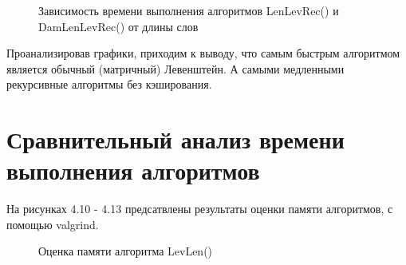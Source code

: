 \begin{figure}
	\caption{Зависимость времени выполнения алгоритмов LenLevRec() и DamLenLevRec() от длины слов}
\end{figure}

\newpage
Проанализировав графики, приходим к выводу, что самым быстрым алгоритмом является обычный (матричный) Левенштейн. А самыми медленными рекурсивные алгоритмы без кэширования.

\newpage
\section{Сравнительный анализ времени выполнения алгоритмов}
На рисунках 4.10 - 4.13 предсатвлены результаты оценки памяти алгоритмов, с помощью valgrind.

\begin{figure}[h]
	\caption{Оценка памяти алгоритма LevLen()}
\end{figure}

